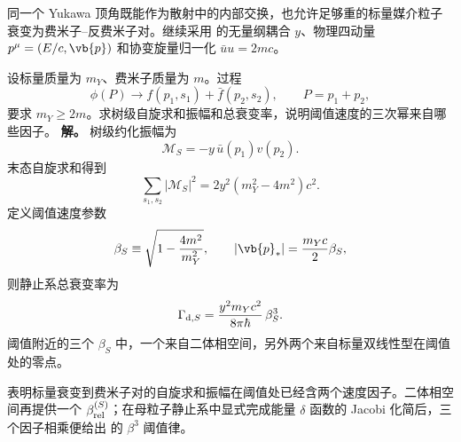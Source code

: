 
同一个 Yukawa 顶角既能作为散射中的内部交换，也允许足够重的标量媒介粒子衰变为费米子--反费米子对。继续采用 的无量纲耦合 $y$、物理四动量 $p^\mu=(E/c,\vb{p})$ 和协变旋量归一化 $\bar uu=2mc$。

\begin{exbox}[标量 Yukawa 衰变]
设标量质量为 $m_Y$、费米子质量为 $m$。过程
\begin{equation*}
 \phi(P)\to f(p_1,s_1)+\bar f(p_2,s_2),
 \qquad P=p_1+p_2,
\end{equation*}
要求 $m_Y\ge2m$。求树级自旋求和振幅和总衰变率，说明阈值速度的三次幂来自哪些因子。
\textbf{解。} 树级约化振幅为
\begin{equation}
 {\mathcal M_S=-y\,\bar u(p_1)v(p_2).}
 \label{eq:yukawa-scalar-decay-M-si-r10}
\end{equation}
末态自旋求和得到
\begin{equation}
 {
 \sum_{s_1,s_2}|\mathcal M_S|^2
 =2y^2(m_Y^2-4m^2)c^2.}
 \label{eq:yukawa-scalar-decay-M2-si-r10}
\end{equation}
定义阈值速度参数
\begin{equation}
 \beta_S\equiv\sqrt{1-\frac{4m^2}{m_Y^2}},
 \qquad
 |\vb{p}_*|=\frac{m_Yc}{2}\beta_S,
 \label{eq:yukawa-decay-beta-si-r10}
\end{equation}
则静止系总衰变率为
\begin{equation}
 {
 \Gamma_{{\rm d},S}
 =\frac{y^2m_Y c^2}{8\pi\hbar}\,\beta_S^3.}
 \label{eq:yukawa-scalar-decay-width-si-r10}
\end{equation}
阈值附近的三个 $\beta_S$ 中，一个来自二体相空间，另外两个来自标量双线性型在阈值处的零点。


\medskip

 表明标量衰变到费米子对的自旋求和振幅在阈值处已经含两个速度因子。二体相空间再提供一个 $\beta_{\rm rel}^{(S)}$；在母粒子静止系中显式完成能量 $\delta$ 函数的 Jacobi 化简后，三个因子相乘便给出 的 $\beta^3$ 阈值律。


\end{exbox}
